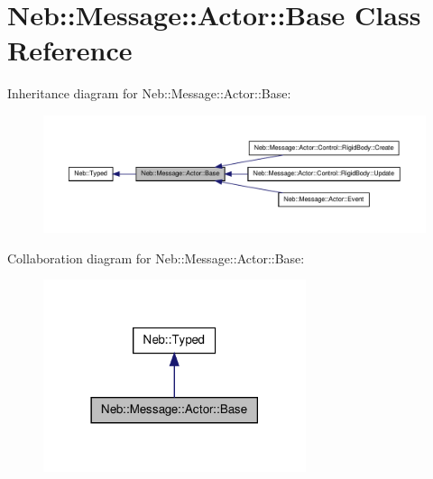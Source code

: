 \hypertarget{classNeb_1_1Message_1_1Actor_1_1Base}{\section{\-Neb\-:\-:\-Message\-:\-:\-Actor\-:\-:\-Base \-Class \-Reference}
\label{classNeb_1_1Message_1_1Actor_1_1Base}
}


\-Inheritance diagram for \-Neb\-:\-:\-Message\-:\-:\-Actor\-:\-:\-Base\-:\nopagebreak
\begin{figure}[H]
\begin{center}
\leavevmode
\includegraphics[width=350pt]{classNeb_1_1Message_1_1Actor_1_1Base__inherit__graph}
\end{center}
\end{figure}


\-Collaboration diagram for \-Neb\-:\-:\-Message\-:\-:\-Actor\-:\-:\-Base\-:\nopagebreak
\begin{figure}[H]
\begin{center}
\leavevmode
\includegraphics[width=218pt]{classNeb_1_1Message_1_1Actor_1_1Base__coll__graph}
\end{center}
\end{figure}
